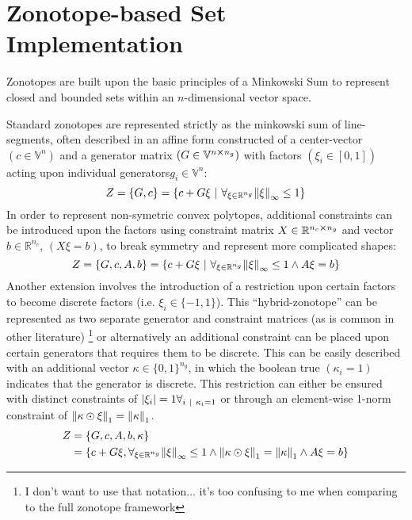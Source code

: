 \documentclass[11pt]{article}
\newcommand{\R}{\mathbb{R}} %
\newcommand{\st}{ \ | \ }
\newcommand{\V}{\mathbb{V}} %
\newcommand{\dSet}{\kappa} %
\begin{document}
\section{Zonotope-based Set Implementation}

Zonotopes are built upon the basic principles of a Minkowski Sum to represent closed and bounded sets within an $n$-dimensional vector space.

Standard zonotopes are represented strictly as the minkowski sum of line-segments, often described in an affine form constructed of a center-vector $(c \in \V^{n})$ and a generator matrix $(G \in \V^{n\cross n_g})$ with factors $(\xi_{i} \in [0,1])$ acting upon individual generators$g_{i} \in \V^{n}$:\[
	Z = \qty{G, c} = \qty{c + G \xi \st \forall_{\xi \in \R^{n_g}} \norm{\xi}_{\infty} \leq 1}
\]
In order to represent non-symetric convex polytopes, additional constraints can be introduced upon the factors using constraint matrix $X \in \R^{n_c \cross n_g}$ and vector $b \in \R^{n_c}$, $(X \xi = b)$, to break symmetry and represent more complicated shapes:\[
	Z = \qty{G, c, A, b} = \qty{c + G \xi \st \forall_{\xi \in \R^{n_g}} \norm{\xi}_{\infty} \leq 1 \land A \xi = b}
\]
Another extension involves the introduction of a restriction upon certain factors to become discrete factors (i.e. $\xi_{i} \in \{-1,1\}$).
This ``hybrid-zonotope'' can be represented as two separate generator and constraint matrices (as is common in other literature)
\footnote{I don't want to use that notation... it's too confusing to me when comparing to the full zonotope framework}
or alternatively an additional constraint can be placed upon certain generators that requires them to be discrete.
This can be easily described with an additional vector $\dSet \in \{0,1\}^{n_g}$, in which the boolean true $(\dSet_{i} = 1)$ indicates that the generator is discrete.
This restriction can either be ensured with distinct constraints of $\abs{\xi_{i}} = 1 \forall_{i \st \dSet_{i} = 1}$ or through an element-wise 1-norm constraint of $\norm{\dSet \odot \xi}_{1} = \norm{\dSet}_{1}$. \[
\begin{aligned}
	Z &= \{G,c,A,b,\dSet\} \\
		&= \qty{c + G \xi,  \forall_{\xi \in \R^{n_g}} \norm{\xi}_\infty \leq 1 \land \norm{\dSet \odot \xi}_{1} = \norm{\dSet}_{1} \land A\xi = b}
\end{aligned}
\]
\end{document}
